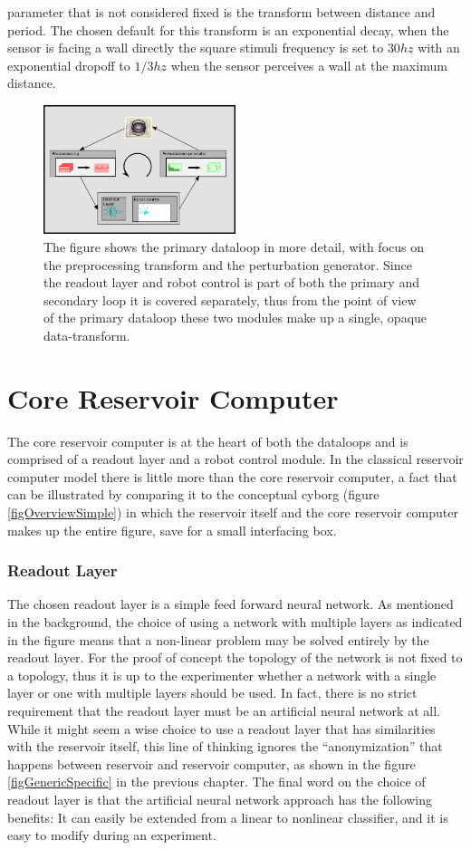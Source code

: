 parameter that is not considered fixed is the transform between distance and
period.
The chosen default for this transform is an exponential decay, when the sensor
is facing a wall directly the square stimuli frequency is set to $30hz$ with an
exponential dropoff to $1/3hz$ when the sensor perceives a wall at the maximum
distance.
\begin{figure}[h!]
  \centering
  \includegraphics[width=0.5\textwidth]{fig/rcLoop.png}
  \caption{
    The figure shows the primary dataloop in more detail, with focus on the
    preprocessing transform and the perturbation generator.
    Since the readout layer and robot control is part of both the primary and
    secondary loop it is covered separately, thus from the point of view of the
    primary dataloop these two modules make up a single, opaque data-transform.
  }
  \label{figDataLoop}
\end{figure}
%
\section{Core Reservoir Computer}
The core reservoir computer is at the heart of both the dataloops and is
comprised of a readout layer and a robot control module.
In the classical reservoir computer model there is little more than the core
reservoir computer, a fact that can be illustrated by comparing it to the
conceptual cyborg (figure \ref{figOverviewSimple}) in which the reservoir itself and the
core reservoir computer makes up the entire figure, save for a small interfacing box.
\subsubsection{Readout Layer}
The chosen readout layer is a simple feed forward neural network.
As mentioned in the background, the choice of using a network with multiple
layers as indicated in the figure means that a non-linear problem may be solved
entirely by the readout layer.
For the proof of concept the topology of the network is not fixed to a topology,
thus it is up to the experimenter whether a network with a single layer or one
with multiple layers should be used.
In fact, there is no strict requirement that the readout layer must be an
artificial neural network at all.
While it might seem a wise choice to use a readout layer that has similarities
with the reservoir itself, this line of thinking ignores the ``anonymization''
that happens between reservoir and reservoir computer, as shown in the figure
\ref{figGenericSpecific} in the previous chapter.
The final word on the choice of readout layer is that the artificial neural
network approach has the following benefits:
It can easily be extended from a linear to nonlinear classifier, and it is easy
to modify during an experiment.
